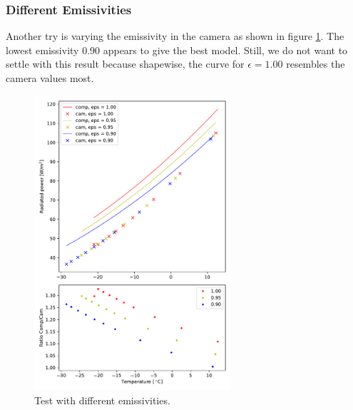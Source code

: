 \subsubsection{Different Emissivities}
Another try is varying the emissivity in the camera as shown in figure \ref{fig:TempPowerEps}. The lowest emissivity 0.90 appears to give the best model. Still, we do not want to settle with this result because shapewise, the curve for $\epsilon=1.00$ resembles the camera values most.
\begin{figure}[h!]
	\centering
	\includegraphics[width=0.65\textwidth]{img/T_to_P_Eps.pdf}
	\caption{Test with different emissivities.}
	\label{fig:TempPowerEps}
\end{figure}
